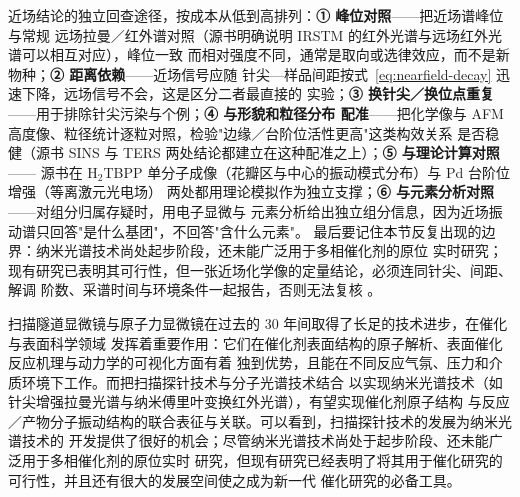 \begin{crosscheck}
近场结论的独立回查途径，按成本从低到高排列：\textbf{① 峰位对照}——把近场谱峰位与常规
远场拉曼／红外谱对照（源书明确说明 IRSTM 的红外光谱与远场红外光谱可以相互对应），峰位一致
而相对强度不同，通常是取向或选律效应，而不是新物种；\textbf{② 距离依赖}——近场信号应随
针尖—样品间距按式~\eqref{eq:nearfield-decay} 迅速下降，远场信号不会，这是区分二者最直接的
实验；\textbf{③ 换针尖／换位点重复}——用于排除针尖污染与个例；\textbf{④ 与形貌和粒径分布
配准}——把化学像与 AFM 高度像、粒径统计逐粒对照，检验"边缘／台阶位活性更高"这类构效关系
是否稳健（源书 SINS 与 TERS 两处结论都建立在这种配准之上）；\textbf{⑤ 与理论计算对照}——
源书在 H$_2$TBPP 单分子成像（花瓣区与中心的振动模式分布）与 Pd 台阶位增强（等离激元光电场）
两处都用理论模拟作为独立支撑；\textbf{⑥ 与元素分析对照}——对组分归属存疑时，用电子显微与
元素分析给出独立组分信息，因为近场振动谱只回答"是什么基团"，不回答"含什么元素"。
最后要记住本节反复出现的边界：纳米光谱技术尚处起步阶段，还未能广泛用于多相催化剂的原位
实时研究；现有研究已表明其可行性，但一张近场化学像的定量结论，必须连同针尖、间距、解调
阶数、采谱时间与环境条件一起报告，否则无法复核
。
\end{crosscheck}

扫描隧道显微镜与原子力显微镜在过去的 30 年间取得了长足的技术进步，在催化与表面科学领域
发挥着重要作用：它们在催化剂表面结构的原子解析、表面催化反应机理与动力学的可视化方面有着
独到优势，且能在不同反应气氛、压力和介质环境下工作。而把扫描探针技术与分子光谱技术结合
以实现纳米光谱技术（如针尖增强拉曼光谱与纳米傅里叶变换红外光谱），有望实现催化剂原子结构
与反应／产物分子振动结构的联合表征与关联。可以看到，扫描探针技术的发展为纳米光谱技术的
开发提供了很好的机会；尽管纳米光谱技术尚处于起步阶段、还未能广泛用于多相催化剂的原位实时
研究，但现有研究已经表明了将其用于催化研究的可行性，并且还有很大的发展空间使之成为新一代
催化研究的必备工具。

